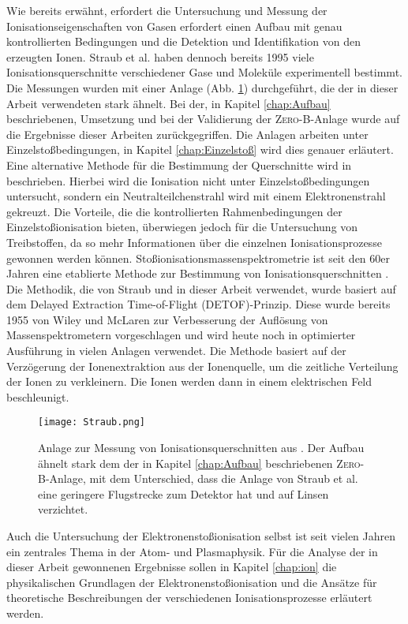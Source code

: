 Wie bereits erwähnt, erfordert die Untersuchung und Messung der Ionisationseigenschaften von Gasen erfordert einen Aufbau mit genau kontrollierten Bedingungen und die Detektion und Identifikation von den erzeugten Ionen. Straub et al. \cite{Straub,Straub2} haben dennoch bereits 1995 viele Ionisationsquerschnitte verschiedener Gase und Moleküle experimentell bestimmt. Die Messungen wurden mit einer Anlage (Abb. \ref{fig:Straub}) durchgeführt, die der in dieser Arbeit verwendeten stark ähnelt. Bei der, in Kapitel \ref{chap:Aufbau} beschriebenen, Umsetzung und bei der Validierung der \textsc{Zero-B}-Anlage wurde auf die Ergebnisse dieser Arbeiten zurückgegriffen. Die Anlagen arbeiten unter Einzelstoßbedingungen, in Kapitel \ref{chap:Einzelstoß} wird dies genauer erläutert. Eine alternative Methode für die Bestimmung der Querschnitte wird in \cite{other_method} beschrieben. Hierbei wird die Ionisation nicht unter Einzelstoßbedingungen untersucht, sondern ein Neutralteilchenstrahl wird mit einem Elektronenstrahl gekreuzt. Die Vorteile, die die kontrollierten Rahmenbedingungen der Einzelstoßionisation bieten, überwiegen jedoch für die Untersuchung von Treibstoffen, da so mehr Informationen über die einzelnen Ionisationsprozesse gewonnen werden können.
Stoßionisationsmassenspektrometrie ist seit den 60er Jahren eine etablierte Methode zur Bestimmung von Ionisationsquerschnitten \cite{EITOFMS}. Die Methodik, die von Straub  und in dieser Arbeit verwendet, wurde basiert auf dem Delayed Extraction Time-of-Flight (DETOF)-Prinzip. Diese wurde bereits 1955 von Wiley und McLaren zur Verbesserung der Auflösung von Massenspektrometern vorgeschlagen \cite{DETOF} und wird heute noch in optimierter Ausführung in vielen Anlagen verwendet. Die Methode basiert auf der Verzögerung der Ionenextraktion aus der Ionenquelle, um die zeitliche Verteilung der Ionen zu verkleinern. Die Ionen werden dann in einem elektrischen Feld beschleunigt.
\begin{figure}
    \centering
    \texttt{[image: Straub.png]}
    \caption[Anlage zur Messung von Ionisationsquerschnitten von Straub et al.]{Anlage zur Messung von Ionisationsquerschnitten aus \cite{Straub2}. Der Aufbau ähnelt stark dem der in Kapitel \ref{chap:Aufbau} beschriebenen \textsc{Zero-B}-Anlage, mit dem Unterschied, dass die Anlage von Straub et al. eine geringere Flugstrecke zum Detektor hat und auf Linsen verzichtet.}
    \label{fig:Straub}
\end{figure}
Auch die Untersuchung der Elektronenstoßionisation selbst ist seit vielen Jahren ein zentrales Thema in der Atom- und Plasmaphysik. Für die Analyse der in dieser Arbeit gewonnenen Ergebnisse sollen in Kapitel \ref{chap:ion} die physikalischen Grundlagen der Elektronenstoßionisation und die Ansätze für theoretische Beschreibungen der verschiedenen Ionisationsprozesse erläutert werden.